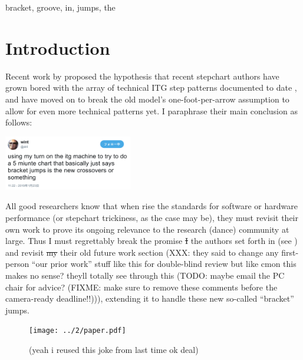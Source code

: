 \documentclass[10pt]{sigplanconf}
\begin{document}

\keywords
bracket, groove, in, jumps, the


\section{Introduction}

Recent work by \cite{dril}
proposed the hypothesis that
recent stepchart authors have grown bored with the array of technical ITG step patterns
documented to date \cite{turniness,crossoveriness},
and have moved on to break the old model's one-foot-per-arrow assumption to allow for even more technical patterns yet.
I paraphrase their main conclusion as follows:

\begin{center}
	\includegraphics[width=0.42\textwidth]{using-my-turn.png}
\end{center}

All good researchers know that when rise the standards for software or hardware performance
(or stepchart trickiness, as the case may be),
they must revisit their own work to prove its ongoing relevance to the research (dance) community at large.
Thus I must regrettably break the promise \sout{I} the authors set forth in \cite{crossoveriness}
(see )
and revisit \sout{my} their old future work section
(XXX: they said to change any first-person ``our prior work''
stuff like this for double-blind review but like cmon this makes no sense?
theyll totally see through this
(TODO: maybe email the PC chair for advice?
(FIXME: make sure to remove these comments before the camera-ready deadline!!))),
extending it to handle these new so-called ``bracket'' jumps.

\begin{figure}[t]
	\hspace{-2em}\texttt{[image: ../2/paper.pdf]}
	\caption{(yeah i reused this joke from last time ok deal)}
	\label{fig:you-stutid-fuckass}
\end{figure}

\end{document}
